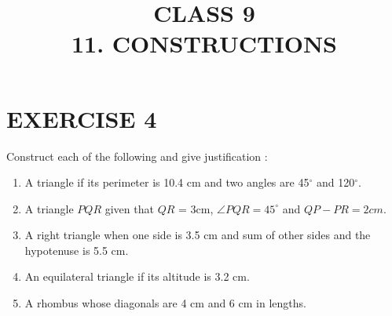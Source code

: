\documentclass{article}
\begin{document}
\title{CLASS 9\\11. CONSTRUCTIONS}
\date{}
\maketitle
\section{EXERCISE 4}
Construct each of the following and give justification :
\begin{enumerate}
\item A triangle if its perimeter is 10.4 cm and two angles are 45$^{\circ}$ and 120$^{\circ}$.
\item A triangle $PQR$ given that $QR$ = 3cm, $\angle PQR = 45^{\circ}$ and $QP - PR = 2 cm$.
\item A right triangle when one side is 3.5 cm and sum of other sides and the hypotenuse
is 5.5 cm.
\item An equilateral triangle if its altitude is 3.2 cm.
\item A rhombus whose diagonals are 4 cm and 6 cm in lengths.
\end{enumerate}
\end{document}
